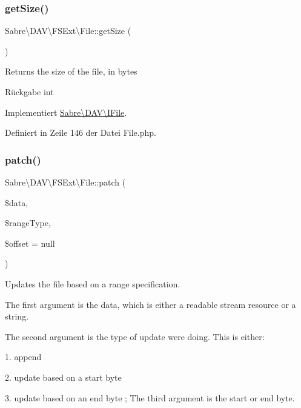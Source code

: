 \subsubsection{\texorpdfstring{get\+Size()}{getSize()}}
{\footnotesize\ttfamily Sabre\textbackslash{}\+D\+A\+V\textbackslash{}\+F\+S\+Ext\textbackslash{}\+File\+::get\+Size (\begin{DoxyParamCaption}{ }\end{DoxyParamCaption})}

Returns the size of the file, in bytes

\begin{DoxyReturn}{Rückgabe}
int 
\end{DoxyReturn}


Implementiert \mbox{\hyperlink{interface_sabre_1_1_d_a_v_1_1_i_file_aa1534e00805f45d9282de9c699dbe178}{Sabre\textbackslash{}\+D\+A\+V\textbackslash{}\+I\+File}}.



Definiert in Zeile 146 der Datei File.\+php.

\mbox{\label{class_sabre_1_1_d_a_v_1_1_f_s_ext_1_1_file_a41eb62da489973b1da84e5957c662103}} 
\subsubsection{\texorpdfstring{patch()}{patch()}}
{\footnotesize\ttfamily Sabre\textbackslash{}\+D\+A\+V\textbackslash{}\+F\+S\+Ext\textbackslash{}\+File\+::patch (\begin{DoxyParamCaption}\item[{}]{\$data,  }\item[{}]{\$range\+Type,  }\item[{}]{\$offset = {\ttfamily null} }\end{DoxyParamCaption})}

Updates the file based on a range specification.

The first argument is the data, which is either a readable stream resource or a string.

The second argument is the type of update we\textquotesingle{}re doing. This is either\+:
\begin{DoxyItemize}
\item 1. append
\item 2. update based on a start byte
\item 3. update based on an end byte ; The third argument is the start or end byte.
\end{DoxyItemize}

